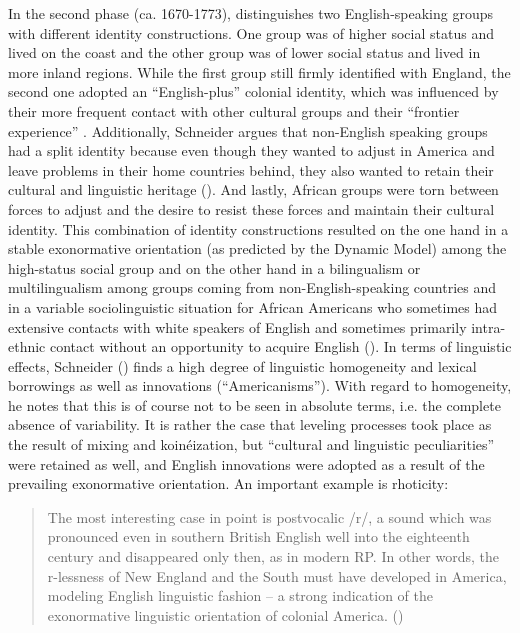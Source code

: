 In the second phase (ca. 1670-1773), \citet[265]{Schneider2007} distinguishes two English-speaking groups with different identity constructions. One group was of higher social status and lived on the coast and the other group was of lower social status and lived in more inland regions. While the first group still firmly identified with England, the second one adopted an “English-plus” colonial identity, which was influenced by their more frequent contact with other cultural groups and their “frontier experience” \citep[265]{Schneider2007}. Additionally, Schneider argues that non-English speaking groups had a split identity because even though they wanted to adjust in America and leave problems in their home countries behind, they also wanted to retain their cultural and linguistic heritage (\citeyear[266]{Schneider2007}). And lastly, African groups were torn between forces to adjust and the desire to resist these forces and maintain their cultural identity. This combination of identity constructions resulted on the one hand in a stable exonormative orientation (as predicted by the Dynamic Model) among the high-status social group and on the other hand in a bilingualism or multilingualism among groups coming from non-English-speaking countries and in a variable sociolinguistic situation for African Americans who sometimes had extensive contacts with white speakers of English and sometimes primarily intra-ethnic contact without an opportunity to acquire English (\citeyear[266--269]{Schneider2007}). In terms of linguistic effects, Schneider (\citeyear[269--273]{Schneider2007}) finds a high degree of linguistic homogeneity and lexical borrowings as well as innovations (“Americanisms”). With regard to homogeneity, he notes that this is of course not to be seen in absolute terms, i.e. the complete absence of variability. It is rather the case that leveling processes took place as the result of mixing and koinéization, but “cultural and linguistic peculiarities” were retained as well, and English innovations were adopted as a result of the prevailing exonormative orientation. An important example is rhoticity:

\begin{quote}
The most interesting case in point is postvocalic /r/, a sound which was pronounced even in southern British English well into the eighteenth century and disappeared only then, as in modern RP. In other words, the r-lessness of New England and the South must have developed in America, modeling English linguistic fashion – a strong indication of the exonormative linguistic orientation of colonial America. (\citeyear[271]{Schneider2007})
\end{quote}


